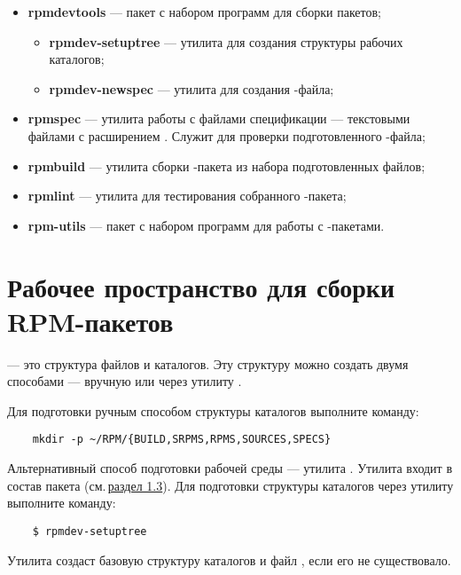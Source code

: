 \begin{itemize}
	\item \textbf{rpmdevtools} --- пакет с набором программ для сборки пакетов; 
	
	\begin{itemize}
		\item \textbf{rpmdev-setuptree} --- утилита для создания структуры рабочих каталогов;
		\item \textbf{rpmdev-newspec} --- утилита для создания -файла;
	\end{itemize}
	
	\item \textbf{rpmspec} --- утилита работы с файлами спецификации --- текстовыми файлами с расширением . Служит для проверки подготовленного -файла;
	
	\item \textbf{rpmbuild} --- утилита сборки -пакета из набора подготовленных файлов;
	
	\item \textbf{rpmlint} --- утилита для тестирования собранного -пакета;
	
	\item \textbf{rpm-utils} --- пакет с набором программ для работы с -пакетами.
\end{itemize}


\section{Рабочее пространство для сборки RPM-пакетов}
 --- это структура файлов и каталогов. Эту структуру можно создать двумя способами --- вручную или через утилиту .

Для подготовки ручным способом структуры каталогов выполните команду:
\begin{verbatim}
	mkdir -p ~/RPM/{BUILD,SRPMS,RPMS,SOURCES,SPECS}
\end{verbatim}

Альтернативный способ подготовки рабочей среды --- утилита . Утилита входит в состав пакета  (см.\,\hyperlink{1.3}{раздел 1.3}). Для подготовки структуры каталогов через утилиту  выполните команду:
\begin{verbatim}
	$ rpmdev-setuptree
\end{verbatim}

Утилита создаст базовую структуру каталогов и файл , если его не существовало.


